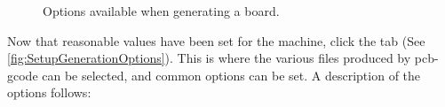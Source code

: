 \documentclass[11pt]{book}
\begin{document}
\begin{figure}
	\caption{Options available when generating a board.}
	\label{fig:SetupGenerationOptions}
\end{figure}

Now that reasonable values have been set for the machine, click the  tab (See \figurename \vref{fig:SetupGenerationOptions}). This is where the various files produced by pcb-gcode can be selected, and common options can be set. A description of the options follows:
\end{document}
